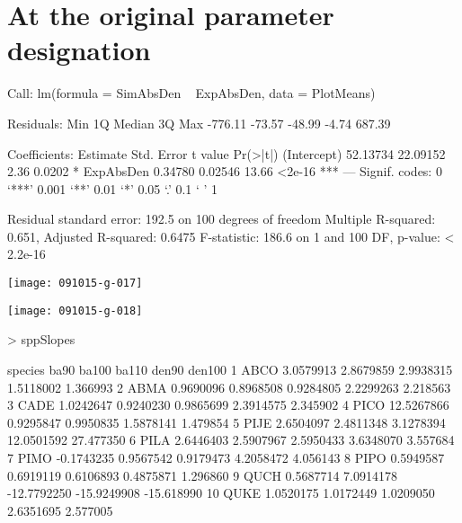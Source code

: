 \documentclass{article}
\begin{document}
\section{At the original parameter designation}
\begin{Schunk}
\begin{Soutput}
Call:
lm(formula = SimAbsDen ~ ExpAbsDen, data = PlotMeans)

Residuals:
    Min      1Q  Median      3Q     Max 
-776.11  -73.57  -48.99   -4.74  687.39 

Coefficients:
            Estimate Std. Error t value Pr(>|t|)    
(Intercept) 52.13734   22.09152    2.36   0.0202 *  
ExpAbsDen    0.34780    0.02546   13.66   <2e-16 ***
---
Signif. codes:  0 ‘***’ 0.001 ‘**’ 0.01 ‘*’ 0.05 ‘.’ 0.1 ‘ ’ 1

Residual standard error: 192.5 on 100 degrees of freedom
Multiple R-squared:  0.651,	Adjusted R-squared:  0.6475 
F-statistic: 186.6 on 1 and 100 DF,  p-value: < 2.2e-16
\end{Soutput}
\end{Schunk}
\texttt{[image: 091015-g-017]}

\texttt{[image: 091015-g-018]}
\begin{Schunk}
\begin{Sinput}
>   sppSlopes
\end{Sinput}
\begin{Soutput}
   species       ba90     ba100       ba110       den90     den100
1     ABCO  3.0579913 2.8679859   2.9938315   1.5118002   1.366993
2     ABMA  0.9690096 0.8968508   0.9284805   2.2299263   2.218563
3     CADE  1.0242647 0.9240230   0.9865699   2.3914575   2.345902
4     PICO 12.5267866 0.9295847   0.9950835   1.5878141   1.479854
5     PIJE  2.6504097 2.4811348   3.1278394  12.0501592  27.477350
6     PILA  2.6446403 2.5907967   2.5950433   3.6348070   3.557684
7     PIMO -0.1743235 0.9567542   0.9179473   4.2058472   4.056143
8     PIPO  0.5949587 0.6919119   0.6106893   0.4875871   1.296860
9     QUCH  0.5687714 7.0914178 -12.7792250 -15.9249908 -15.618990
10    QUKE  1.0520175 1.0172449   1.0209050   2.6351695   2.577005
\end{Soutput}
\end{Schunk}





\newpage
\end{document}
